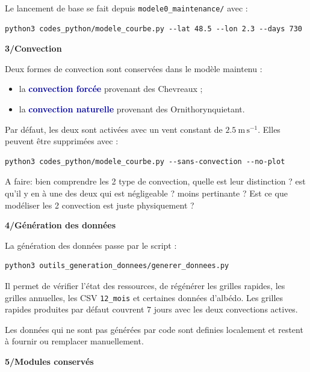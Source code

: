 \documentclass[11pt,a4paper]{article}
\newcommand{\code}[1]{\texttt{#1}}
\newcommand{\motcle}[1]{\textcolor{DarkBlue}{\textbf{#1}}}
\newcommand{\partietitre}[1]{%
    \vspace{1.1em}
    {\Large\bfseries\textcolor{DocRed}{#1}}\par
    \vspace{0.35em}
}
\begin{document}
Le lancement de base se fait depuis \code{modele0\_maintenance/} avec :

\begin{verbatim}
python3 codes_python/modele_courbe.py --lat 48.5 --lon 2.3 --days 730
\end{verbatim}

\partietitre{3/Convection}

Deux formes de convection sont conservées dans le modèle maintenu :

\begin{itemize}
    \item la \motcle{convection forcée} provenant des Chevreaux ;
    \item la \motcle{convection naturelle} provenant des Ornithorynquietant.
\end{itemize}

Par défaut, les deux sont activées avec un vent constant de $2.5\ \mathrm{m\,s^{-1}}$. Elles peuvent être supprimées avec :

\begin{verbatim}
python3 codes_python/modele_courbe.py --sans-convection --no-plot
\end{verbatim}

\textcolor{green!50!black}{A faire: bien comprendre les 2 type de convection, quelle est leur distinction ? est qu'il y en à une des deux qui est négligeable ? moins pertinante ? Est ce que modéliser les 2 convection est juste physiquement ?}

\partietitre{4/Génération des données}

La génération des données passe par le script :

\begin{verbatim}
python3 outils_generation_donnees/generer_donnees.py
\end{verbatim}

Il permet de vérifier l'état des ressources, de régénérer les grilles rapides, les grilles annuelles, les CSV \code{12\_mois} et certaines données d'albédo. Les grilles rapides produites par défaut couvrent $7$ jours avec les deux convections actives.

Les données qui ne sont pas générées par code sont definies localement et restent à fournir ou remplacer manuellement.

\partietitre{5/Modules conservés}
\end{document}
